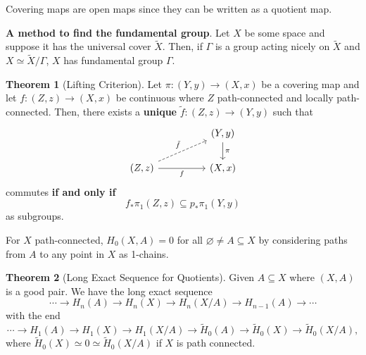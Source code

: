 \documentclass[]{article}
\theoremstyle{definition}
\newtheorem*{theorem}{Theorem}
\begin{document}
Covering maps are open maps since they can be written as a quotient map.

\textbf{A method to find the fundamental group}. Let \(X\) be some space and suppose it has the universal 
cover \(\tilde X\). Then, if \(\Gamma\) is a group acting nicely on \(\tilde X\) and 
\(X \simeq \tilde X / \Gamma\), \(X\) has fundamental group \(\Gamma\). 

\begin{theorem}[Lifting Criterion]
  Let \(\pi : (Y, y) \to (X, x)\) be a covering map and let \(f : (Z, z) \to (X, x)\) 
  be continuous where \(Z\) path-connected and locally path-connected. Then, 
  there exists a \textbf{unique} \(\tilde f : (Z, z) \to (Y, y)\) such that 
  \[\begin{tikzcd}
    && {(Y, y)} \\
    {(Z, z)} && {(X,x)}
    \arrow["\pi", from=1-3, to=2-3]
    \arrow["f"', from=2-1, to=2-3]
    \arrow["{\tilde f}", dashed, from=2-1, to=1-3]
  \end{tikzcd}\]
  commutes \textbf{if and only if} 
  \[f_*\pi_1(Z, z) \subseteq p_* \pi_1(Y, y)\]
  as subgroups.
\end{theorem}

For \(X\) path-connected, \(H_0(X, A) = 0\) for all \(\varnothing \neq A \subseteq X\) by considering 
paths from \(A\) to any point in \(X\) as 1-chains.

\begin{theorem}[Long Exact Sequence for Quotients]
  Given \(A \subseteq X\) where \((X, A)\) is a good pair. We have the long exact sequence 
  \[\cdots \to H_n(A) \to H_n(X) \to H_n(X / A) \to H_{n - 1}(A) \to \cdots\]
  with the end 
  \[\cdots \to H_1(A) \to H_1(X) \to H_1(X / A) \to \tilde H_0(A) \to \tilde H_0(X) \to \tilde H_0(X / A),\]
  where \(\tilde H_0(X) \simeq 0 \simeq \tilde H_0(X / A)\) if \(X\) is path connected.
\end{theorem}
\end{document}
